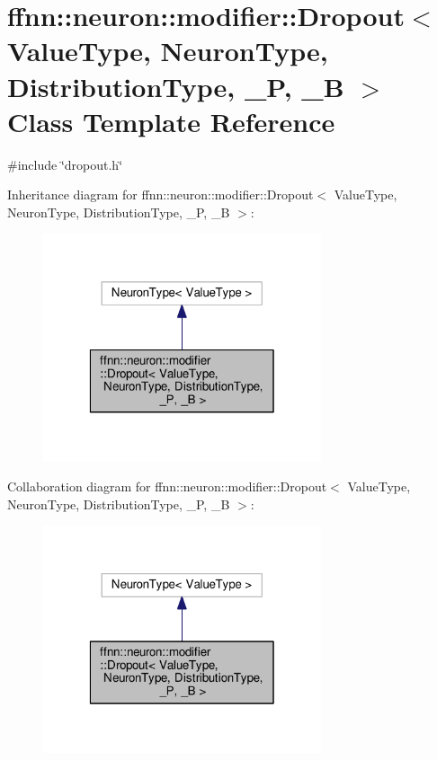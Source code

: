 \hypertarget{classffnn_1_1neuron_1_1modifier_1_1_dropout}{\section{ffnn\-:\-:neuron\-:\-:modifier\-:\-:Dropout$<$ Value\-Type, Neuron\-Type, Distribution\-Type, \-\_\-\-P, \-\_\-\-B $>$ Class Template Reference}
\label{classffnn_1_1neuron_1_1modifier_1_1_dropout}
}


{\ttfamily \#include \char`\"{}dropout.\-h\char`\"{}}



Inheritance diagram for ffnn\-:\-:neuron\-:\-:modifier\-:\-:Dropout$<$ Value\-Type, Neuron\-Type, Distribution\-Type, \-\_\-\-P, \-\_\-\-B $>$\-:\nopagebreak
\begin{figure}[H]
\begin{center}
\leavevmode
\includegraphics[width=232pt]{classffnn_1_1neuron_1_1modifier_1_1_dropout__inherit__graph}
\end{center}
\end{figure}


Collaboration diagram for ffnn\-:\-:neuron\-:\-:modifier\-:\-:Dropout$<$ Value\-Type, Neuron\-Type, Distribution\-Type, \-\_\-\-P, \-\_\-\-B $>$\-:\nopagebreak
\begin{figure}[H]
\begin{center}
\leavevmode
\includegraphics[width=232pt]{classffnn_1_1neuron_1_1modifier_1_1_dropout__coll__graph}
\end{center}
\end{figure}
